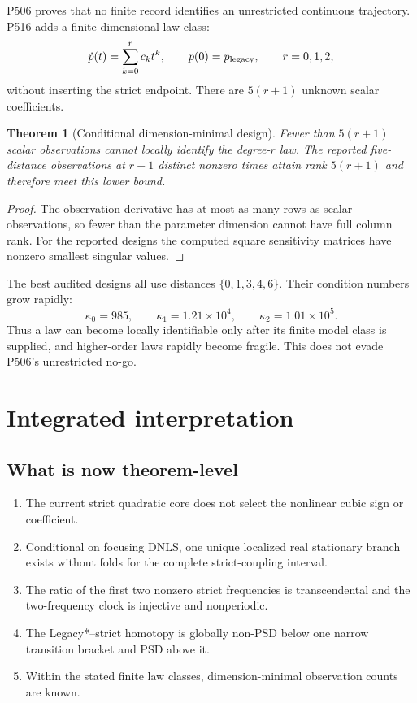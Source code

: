 \documentclass[11pt,a4paper]{article}
\newtheorem{theorem}{Theorem}[section]
\theoremstyle{definition}
\theoremstyle{remark}
\begin{document}
P506 proves that no finite record identifies an unrestricted continuous trajectory. P516 adds a finite-dimensional law class:
\[
 \dot p(t)=\sum_{k=0}^{r}c_kt^k,\qquad p(0)=p_{\rm legacy},\qquad r=0,1,2,
\]
without inserting the strict endpoint. There are $5(r+1)$ unknown scalar coefficients.

\begin{theorem}[Conditional dimension-minimal design]
Fewer than $5(r+1)$ scalar observations cannot locally identify the degree-$r$ law. The reported five-distance observations at $r+1$ distinct nonzero times attain rank $5(r+1)$ and therefore meet this lower bound.
\end{theorem}
\begin{proof}
The observation derivative has at most as many rows as scalar observations, so fewer than the parameter dimension cannot have full column rank. For the reported designs the computed square sensitivity matrices have nonzero smallest singular values.
\end{proof}

The best audited designs all use distances $\{0,1,3,4,6\}$. Their condition numbers grow rapidly:
\[
 \kappa_0=985,\qquad \kappa_1=1.21\times10^4,\qquad
 \kappa_2=1.01\times10^5.
\]
Thus a law can become locally identifiable only after its finite model class is supplied, and higher-order laws rapidly become fragile. This does not evade P506's unrestricted no-go.

\section{Integrated interpretation}

\subsection{What is now theorem-level}

\begin{enumerate}
\item The current strict quadratic core does not select the nonlinear cubic sign or coefficient.
\item Conditional on focusing DNLS, one unique localized real stationary branch exists without folds for the complete strict-coupling interval.
\item The ratio of the first two nonzero strict frequencies is transcendental and the two-frequency clock is injective and nonperiodic.
\item The Legacy*--strict homotopy is globally non-PSD below one narrow transition bracket and PSD above it.
\item Within the stated finite law classes, dimension-minimal observation counts are known.
\end{enumerate}
\end{document}
